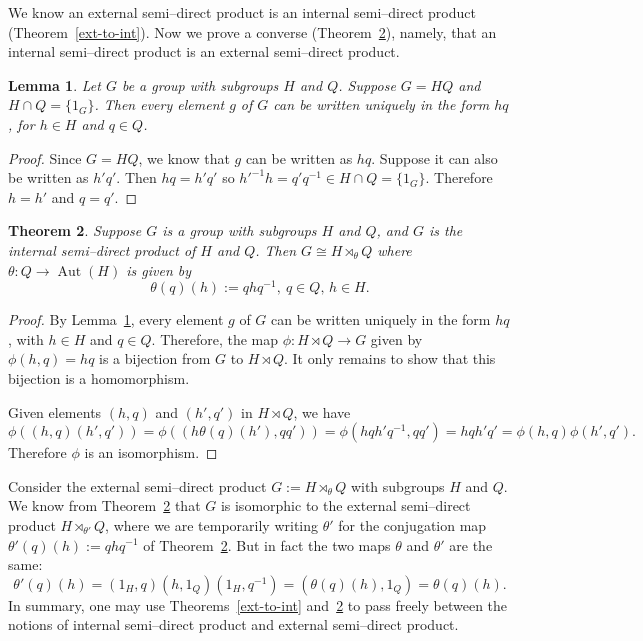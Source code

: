 \documentclass[12pt]{article}
\newcommand{\0}{\bf{0}}
\newcommand{\<}{\langle}
\renewcommand{\>}{\rangle}
\newcommand{\lra}{\longrightarrow}
\newcommand{\iso}{\cong}
\newcommand{\intersect}{\cap}
\newcommand{\Aut}{\operatorname{Aut}}
\newcommand{\semidirect}{\rtimes}
\newtheorem{theorem}{Theorem}
\newtheorem{lemma}[theorem]{Lemma}
\theoremstyle{definition}
\begin{document}
We know an external semi--direct product is an internal semi--direct
product (Theorem~\ref{ext-to-int}). Now we prove a converse (Theorem~\ref{int-to-ext}), namely, that an internal semi--direct product is an external semi--direct product.

\begin{lemma}\label{unique}
Let $G$ be a group with subgroups $H$ and $Q$. Suppose $G=HQ$ and $H
\intersect Q = \{1_G\}$. Then every element $g$ of $G$ can be written
uniquely in the form $hq$, for $h \in H$ and $q \in Q$.
\end{lemma}
\begin{proof}
Since $G=HQ$, we know that $g$ can be written as $hq$. Suppose it can
also be written as $h'q'$. Then $hq=h'q'$ so ${h'}^{-1}h = q' q^{-1} \in
H \intersect Q = \{1_G\}$. Therefore $h=h'$ and $q=q'$.
\end{proof}

\begin{theorem}\label{int-to-ext}
Suppose $G$ is a group with subgroups $H$ and $Q$, and $G$ is the
internal semi--direct product of $H$ and $Q$. Then $G \iso H
\semidirect_\theta Q$ where $\theta: Q \lra \Aut(H)$ is given by
$$
\theta(q)(h) := qhq^{-1},\ q \in Q,\, h \in H.
$$
\end{theorem}
\begin{proof}
By Lemma~\ref{unique}, every element $g$ of $G$ can be written
uniquely in the form $hq$, with $h \in H$ and $q \in Q$. Therefore,
the map $\phi: H \semidirect Q \lra G$ given by $\phi(h,q) = hq$ is a
bijection from $G$ to $H \semidirect Q$. It only remains to show that
this bijection is a homomorphism.

Given elements $(h,q)$ and $(h',q')$ in $H \semidirect Q$, we have
$$
\phi((h,q)(h',q')) = \phi((h \theta(q)(h'),qq')) =
\phi(hqh'q^{-1},qq') = hqh'q' = \phi(h,q) \phi(h',q').
$$
Therefore $\phi$ is an isomorphism.
\end{proof}

Consider the external semi--direct product $G := H \semidirect_\theta
Q$ with subgroups $H$ and $Q$. We know from Theorem~\ref{int-to-ext}
that $G$ is isomorphic to the external semi--direct product $H
\semidirect_{\theta'} Q$, where we are temporarily writing $\theta'$
for the conjugation map $\theta'(q)(h) := qhq^{-1}$ of
Theorem~\ref{int-to-ext}. But in fact the two maps $\theta$ and
$\theta'$ are the same:
$$
\theta'(q)(h) = (1_H,q) (h,1_Q) (1_H, q^{-1}) = (\theta(q)(h),1_Q) =
\theta(q)(h).
$$
In summary, one may use Theorems~\ref{ext-to-int} and~\ref{int-to-ext} to pass freely between the notions of internal semi--direct product and external semi--direct product.
\end{document}
